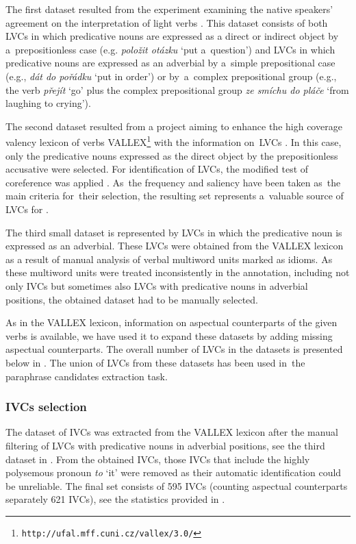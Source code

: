 \documentclass[output=paper
,modfonts
,nonflat]{langsci/langscibook}
\begin{document}
The first dataset resulted from the experiment examining the native speakers’ 
agreement on the interpretation of light verbs \citep{KeLoCorpusBased2013}. 
This dataset consists of both LVCs in which predicative nouns are expressed as 
a direct or indirect object by a~prepositionless case (e.g. \textit{položit 
otázku} `put a~question') and LVCs in which predicative nouns are expressed 
as an adverbial by a~simple prepositional case (e.g., \textit{dát do pořádku} 
`put in order') or by~a~complex prepositional group (e.g., the verb 
\textit{přejít}  `go' plus the complex prepositional group 
\textit{ze smíchu do pláče} `from laughing to crying'). 

The second dataset resulted from a project aiming to enhance the high coverage
valency lexicon of  verbs VALLEX\footnote{\texttt{http://ufal.mff.cuni.cz/vallex/3.0/}} 
with the information on~LVCs \citep{KeBaLoLexicographicDescription2016}. 
In this case, only the predicative nouns expressed as the direct object by the 
prepositionless accusative were selected. For identification of LVCs, the 
modified test of coreference was applied \citep{kettnerova-bejcek-2016}. As~the 
frequency and saliency have been taken as~the main criteria for~their 
selection, the resulting set represents a~valuable source of LVCs for . 

The third small dataset is represented by LVCs in which the predicative noun is 
expressed as an adverbial. These LVCs were obtained from the VALLEX lexicon 
as a result of manual analysis of verbal multiword units marked as idioms. As 
these multiword units were treated inconsistently in the annotation, 
including not only IVCs but sometimes also LVCs with predicative nouns in 
adverbial positions, the obtained dataset had to be manually selected.

As in the VALLEX lexicon, information on aspectual counterparts of the given verbs is 
available, we have used it to expand these datasets by adding missing aspectual 
counterparts. The overall number of LVCs in the datasets is presented below in 
. The union of LVCs from these datasets has been used in~the 
paraphrase candidates extraction task.

\subsubsection{IVCs selection}

The dataset of IVCs was extracted from the VALLEX lexicon after the manual
filtering of LVCs with predicative nouns in adverbial positions, see the third
dataset in . From the obtained IVCs, those IVCs 
that include the highly polysemous pronoun \textit{to} `it' were removed 
as their automatic identification could be unreliable. The final set consists of 
595 IVCs (counting aspectual counterparts separately 621 IVCs), see the 
statistics provided in . 
\end{document}
